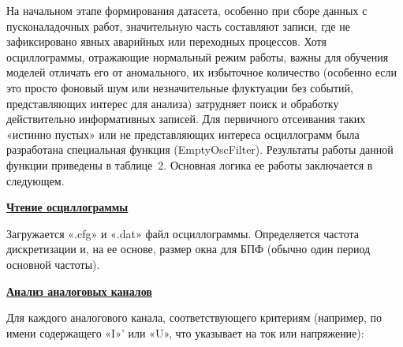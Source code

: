 


На начальном этапе формирования датасета, особенно при сборе данных с пусконаладочных работ, значительную часть составляют записи, где не зафиксировано явных аварийных или переходных процессов. Хотя осциллограммы, отражающие нормальный режим работы, важны для обучения моделей отличать его от аномального, их избыточное количество (особенно если это просто фоновый шум или незначительные флуктуации без событий, представляющих интерес для анализа) затрудняет поиск и обработку действительно информативных записей. Для первичного отсеивания таких «истинно пустых» или не представляющих интереса осциллограмм была разработана специальная функция (EmptyOscFilter). Результаты работы данной функции приведены в таблице~2. Основная логика ее работы заключается в следующем.

\noindent\textbf{\underline{Чтение осциллограммы}}\par\vspace{0.1cm}

Загружается «.cfg» и «.dat» файл осциллограммы. Определяется частота дискретизации и, на ее основе, размер окна для БПФ (обычно один период основной частоты).

\noindent\textbf{\underline{Анализ аналоговых каналов}}\par\vspace{0.1cm}

Для каждого аналогового канала, соответствующего критериям (например, по имени содержащего «I»' или «U», что указывает на ток или напряжение):

